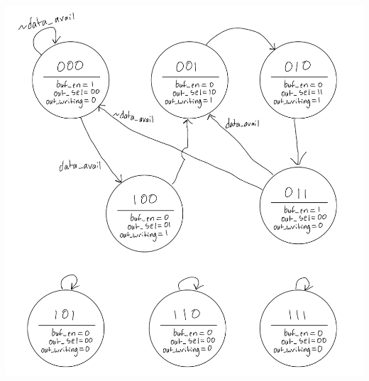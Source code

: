 \documentclass[a4paper, 12pt]{scrartcl}
\begin{document}
\begin{center}
\includegraphics[height=0.75\textwidth]{./ex9_std.jpeg}
\end{center}
\end{document}
